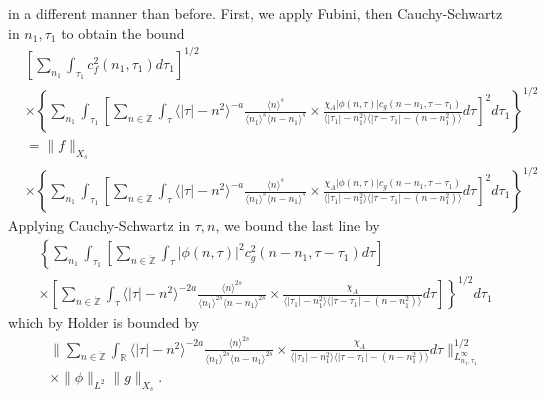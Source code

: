 \documentclass[12pt,reqno]{amsart}
\numberwithin{equation}{section}  %
\newcommand{\rr}{\mathbb{R}}
\newcommand{\zz}{\mathbb{Z}}
\newcommand{\zzdot}{\dot{\zz}}
\begin{document}
in a different manner than before. First, we apply 
Fubini, then Cauchy-Schwartz in $n_{1}, \tau_{1}$ to obtain the bound
%
%
\begin{equation*}
\begin{split}
  & \left[ \sum_{n_{1}} \int_{\tau_{1}} c_{f}^{2}(n_{1}, \tau_{1}) d \tau_{1}
  \right]^{1/2}
  \\
  & \times \left \{\sum_{n_{1}} \int_{\tau_{1}}   
 \left[
 \sum_{n \in \zzdot} \int_{\tau} \langle | \tau | - n^{2} \rangle ^{-a}
   \frac{\langle n \rangle ^{s}}{\langle n_{1} \rangle ^{s} \langle
   n - n_{1}\rangle ^{s}} \times \frac{\chi_{A} |\phi(n, \tau)| c_{g}(n -
   n_{1}, \tau - \tau_{1})
}{\langle | \tau_{1} | - n_{1}^{2} \rangle \langle | \tau -
  \tau_{1} | - (n - n_{1}^{2}) \rangle} d \tau 
  \right]^{2} d \tau_{1} \right \}^{1/2}
  \\
  & = \| f \|_{X_{s}}
  \\
  & \times \left \{\sum_{n_{1}} \int_{\tau_{1}}   
 \left[
 \sum_{n \in \zzdot} \int_{\tau} \langle | \tau | - n^{2} \rangle ^{-a}
   \frac{\langle n \rangle ^{s}}{\langle n_{1} \rangle ^{s} \langle
   n - n_{1}\rangle ^{s}} \times \frac{\chi_{A}|\phi(n, \tau)| c_{g}(n -
   n_{1}, \tau - \tau_{1}) 
}{\langle | \tau_{1} | - n_{1}^{2} \rangle \langle | \tau -
  \tau_{1} | - (n - n_{1}^{2}) \rangle} d \tau 
  \right]^{2} d \tau_{1}  \right \}^{1/2}
\end{split}
\end{equation*}
%
Applying Cauchy-Schwartz in $\tau, n$, we bound the last line by 
%
%
\begin{equation*}
\begin{split}
  & \left \{\sum_{n_{1}} \int_{\tau_{1}}   
  \left [ \sum_{n \in \zzdot} \int_{\tau}
  | \phi(n, \tau)|^{2} c_{g}^{2}(n - n_{1}, \tau - \tau_{1}) d \tau  
    \right ] \right . 
   \\
   & \left. \times \left [ \sum_{n \in \zzdot} \int_{\tau} 
\langle | \tau | - n^{2} \rangle ^{-2a}
     \frac{\langle n \rangle
   ^{2s}}{\langle n_{1} \rangle ^{2s} \langle n - n_{1}\rangle ^{2s}}
   \times \frac{\chi_{A}}{\langle | \tau_{1} |
   - n_{1}^{2} \rangle  \langle | \tau - \tau_{1} | - (n - n_{1}^{2})
   \rangle} d \tau  \right ] \right \}^{1/2}d \tau_{1} 
\end{split}
\end{equation*}
%
%
which by Holder is bounded by 
%
%
%
\begin{equation}
  \label{integral-bound-2nd-form-per}
\begin{split}
  & \| \sum_{n \in \zzdot} \int_{\rr} 
\langle | \tau | - n^{2} \rangle ^{-2a}
  \frac{\langle n \rangle ^{2s}}{\langle n_{1} \rangle ^{2s} \langle
  n - n_{1}\rangle ^{2s}}  \times \frac{\chi_{A}}{\langle | \tau_{1} | - n_{1}^{2} \rangle  \langle | \tau -
  \tau_{1} | - (n - n_{1}^{2}) \rangle} d \tau 
  \|_{L^{\infty}_{n_{1}, \tau_{1}}}^{1/2}
  \\
  & \times \|\phi\|_{L^{2}} \| g \|_{X_{s}}.
\end{split}
\end{equation}
\end{document}
